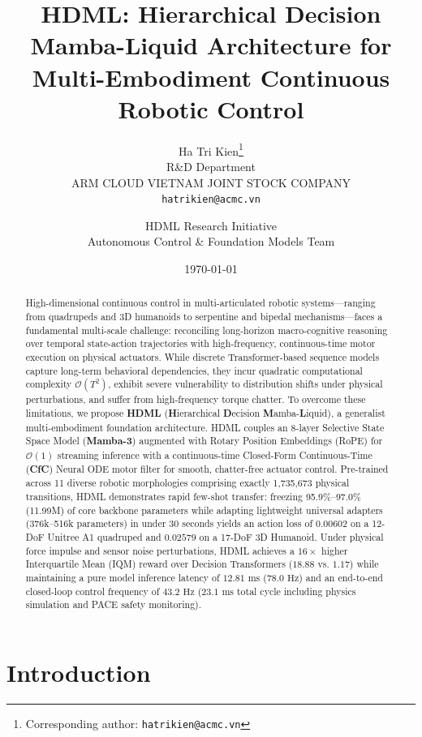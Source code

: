 \documentclass{article}
\title{HDML: Hierarchical Decision Mamba-Liquid Architecture for Multi-Embodiment Continuous Robotic Control}
\author{
  Ha Tri Kien\thanks{Corresponding author: \texttt{hatrikien@acmc.vn}} \\
  R\&D Department \\
  ARM CLOUD VIETNAM JOINT STOCK COMPANY \\
  \texttt{hatrikien@acmc.vn} \\
  \and
  HDML Research Initiative \\
  Autonomous Control \& Foundation Models Team \\
}
\date{\today}
\begin{document}
\maketitle

\begin{abstract}
High-dimensional continuous control in multi-articulated robotic systems---ranging from quadrupeds and 3D humanoids to serpentine and bipedal mechanisms---faces a fundamental multi-scale challenge: reconciling long-horizon macro-cognitive reasoning over temporal state-action trajectories with high-frequency, continuous-time motor execution on physical actuators. While discrete Transformer-based sequence models capture long-term behavioral dependencies, they incur quadratic computational complexity $\mathcal{O}(T^2)$, exhibit severe vulnerability to distribution shifts under physical perturbations, and suffer from high-frequency torque chatter. To overcome these limitations, we propose \textbf{HDML} (\textbf{H}ierarchical \textbf{D}ecision \textbf{M}amba-\textbf{L}iquid), a generalist multi-embodiment foundation architecture. HDML couples an 8-layer Selective State Space Model (\textbf{Mamba-3}) augmented with Rotary Position Embeddings (RoPE) for $\mathcal{O}(1)$ streaming inference with a continuous-time Closed-Form Continuous-Time (\textbf{CfC}) Neural ODE motor filter for smooth, chatter-free actuator control. Pre-trained across 11 diverse robotic morphologies comprising exactly 1,735,673 physical transitions, HDML demonstrates rapid few-shot transfer: freezing 95.9\%--97.0\% (11.99M) of core backbone parameters while adapting lightweight universal adapters (376k--516k parameters) in under 30 seconds yields an action loss of $0.00602$ on a 12-DoF Unitree A1 quadruped and $0.02579$ on a 17-DoF 3D Humanoid. Under physical force impulse and sensor noise perturbations, HDML achieves a $16\times$ higher Interquartile Mean (IQM) reward over Decision Transformers ($18.88$ vs. $1.17$) while maintaining a pure model inference latency of $12.81\text{ ms}$ ($78.0\text{ Hz}$) and an end-to-end closed-loop control frequency of $43.2\text{ Hz}$ ($23.1\text{ ms}$ total cycle including physics simulation and PACE safety monitoring).
\end{abstract}


\section{Introduction}
\label{sec:intro}
\end{document}
